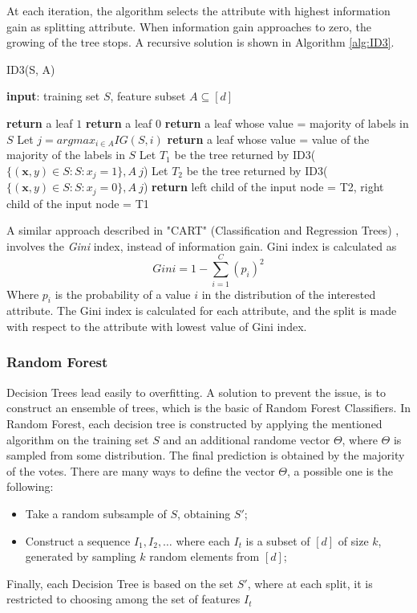 At each iteration, the algorithm selects the attribute with highest information gain as splitting attribute. When information gain approaches to zero, the growing of the tree stops. A recursive solution is shown in Algorithm \ref{alg:ID3}.

\begin{algorithm}
	\caption{ID3(S, A)}
	\label{alg:ID3}
	\begin{algorithmic}[1]
		\State \textbf{input}: training set $S$, feature subset $A \subseteq [d]$
		
		\State \textbf{return} a leaf $1$
		\EndIf
		\State \textbf{return} a leaf $0$
		\EndIf
		\State \textbf{return} a leaf whose value = majority of labels in $S$
		\Else
		\State Let $j = argmax_{i \in A} IG(S, i)$
		\State \textbf{return} a leaf whose value = value of the majority of the labels in $S$
		\Else
		\State Let $T_1$ be the tree returned by ID3($\{(\mathbf{x}, y) \in S : S: x_j = 1\}, A \ {j}$)
		\State Let $T_2$ be the tree returned by ID3($\{(\mathbf{x}, y) \in S : S: x_j = 0\}, A \ {j}$)
		\State \textbf{return} left child of the input node = T2, right child of the input node = T1
		\EndIf
		\EndIf

	\end{algorithmic}
\end{algorithm}

A similar approach described in "CART" (Classification and Regression Trees) \cite{cart84}, involves the \textit{Gini} index, instead of information gain. Gini index is calculated as 
\[ Gini = 1 - \sum_{i=1}^{C} (p_i)^2 \]
Where $p_i$ is the probability of a value $i$ in the distribution of the interested attribute. The Gini index is calculated for each attribute, and the split is made with respect to the attribute with lowest value of Gini index.


\subsubsection{Random Forest}
Decision Trees lead easily to overfitting. A solution to prevent the issue, is to construct an ensemble of trees, which is the basic of Random Forest Classifiers. In Random Forest, each decision tree is constructed by applying the mentioned algorithm on the training set $S$ and an additional randome vector $\Theta$, where $\Theta$ is sampled from some distribution. The final prediction is obtained by the majority of the votes. There are many ways to define the vector $\Theta$, a possible one is the following:
\begin{itemize}
	\item Take a random subsample of $S$, obtaining $S'$;
	\item Construct a sequence $I_1, I_2, \dots$ where each $I_t$ is a subset of $[d]$ of size $k$, generated by sampling $k$ random elements from $[d]$;
\end{itemize}
Finally, each Decision Tree is based on the set $S'$, where at each split, it is restricted to choosing among the set of features $I_t$



